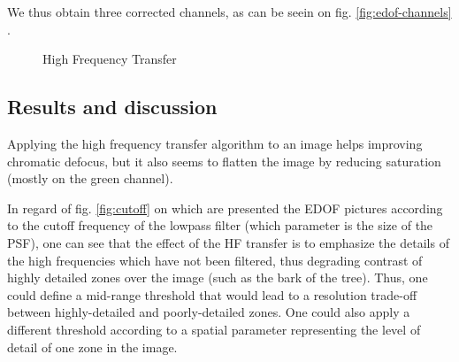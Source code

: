 \documentclass[10pt,letterpaper]{article}
\begin{document}
We thus obtain three corrected channels, as can be seein on fig. \ref{fig:edof-channels} .

\begin{figure}[h]
    \centering
	\caption{High Frequency Transfer}
\end{figure}
\pagebreak

\subsection*{Results and discussion}
Applying the high frequency transfer algorithm to an image helps improving chromatic defocus, but it also seems to flatten the image by reducing saturation (mostly on the green channel).

In regard of fig. \ref{fig:cutoff} on which are presented the EDOF pictures according to the cutoff frequency of the lowpass filter (which parameter is the size of the PSF), one can see that the effect of the HF transfer is to emphasize the details of the high frequencies which have not been filtered, thus degrading contrast of highly detailed zones over the image (such as the bark of the tree). Thus, one could define a mid-range threshold that would lead to a resolution trade-off between highly-detailed and poorly-detailed zones. One could also apply a different threshold according to a spatial parameter representing the level of detail of one zone in the image.
\end{document}
